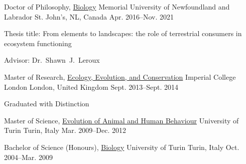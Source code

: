 

\begin{cventries}

  \cventry
    {Doctor of Philosophy, \href{http://www.mun.ca/biology}{Biology}} %
    {Memorial University of Newfoundland and Labrador} %
    {St. John's, NL, Canada} %
    {Apr. 2016--Nov. 2021} %
    {
      \begin{cvitems} %
        \item {Thesis title: From elements to landscapes: the role of terrestrial consumers in ecosystem functioning}
        \item {Advisor: Dr.~Shawn~J.~Leroux}
      \end{cvitems}
    }

  \cventry
    {Master of Research, \href{https://www.imperial.ac.uk/study/pg/life-sciences/ecology-evolution-conservation-research/}{Ecology, Evolution, and Conservation}} %
    {Imperial College London} %
    {London, United Kingdom} %
    {Sept. 2013--Sept. 2014} %
    {
      \begin{cvitems} %
        \item {Graduated with Distinction}
      \end{cvitems}
    }
  
  \cventry
    {Master of Science, \href{https://goo.gl/rCzbq7}{Evolution of Animal and Human Behaviour}} %
    {University of Turin} %
    {Turin, Italy} %
    {Mar. 2009--Dec. 2012} %
    {}
  
  \cventry
    {Bachelor of Science (Honours), \href{http://biologia.campusnet.unito.it/do/home.pl}{Biology}} %
    {University of Turin} %
    {Turin, Italy} %
    {Oct. 2004--Mar. 2009} %
    {}
\end{cventries}

